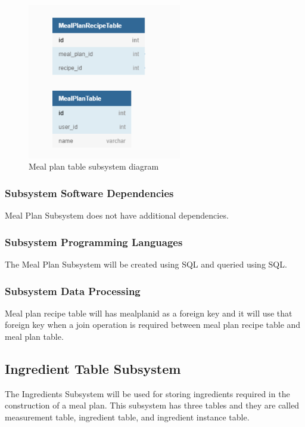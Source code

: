 \begin{figure}[h!]
	\centering
 	\includegraphics[width=0.60\textwidth]{images/MealPlan_SubSystem.png}
 \caption{Meal plan table subsystem diagram}
\end{figure}

\subsubsection{Subsystem Software Dependencies}
Meal Plan Subsystem does not have additional dependencies.

\subsubsection{Subsystem Programming Languages}
The Meal Plan Subsystem will be created using SQL and queried using SQL.

\subsubsection{Subsystem Data Processing}
Meal plan recipe table will has mealplanid as a foreign key and it will use that foreign key when a join operation is required between meal plan recipe table and meal plan table.

\subsection{Ingredient Table Subsystem}
The Ingredients Subsystem will be used for storing ingredients required in the construction of a meal plan. This subsystem has three tables and they are called measurement table, ingredient table, and ingredient instance table.

